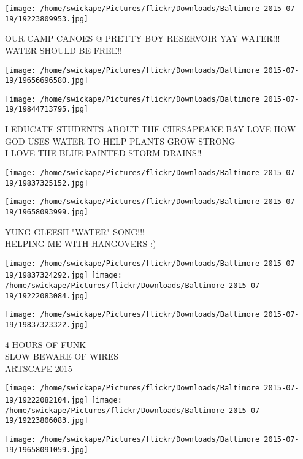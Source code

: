 \documentclass[10pt,letterpaper]{article}
\begin{document}
\vspace{0.25in}
\texttt{[image: /home/swickape/Pictures/flickr/Downloads/Baltimore 2015-07-19/19223809953.jpg]}

OUR CAMP CANOES @ PRETTY BOY RESERVOIR YAY WATER!!!\\
WATER SHOULD BE FREE!!\\
\pagebreak

\texttt{[image: /home/swickape/Pictures/flickr/Downloads/Baltimore 2015-07-19/19656696580.jpg]}

\vspace{0.25in}
\texttt{[image: /home/swickape/Pictures/flickr/Downloads/Baltimore 2015-07-19/19844713795.jpg]}

I EDUCATE STUDENTS ABOUT THE CHESAPEAKE BAY LOVE HOW GOD USES WATER TO HELP PLANTS GROW STRONG\\
I LOVE THE BLUE PAINTED STORM DRAINS!!\\
\pagebreak

\texttt{[image: /home/swickape/Pictures/flickr/Downloads/Baltimore 2015-07-19/19837325152.jpg]}

\vspace{0.25in}
\texttt{[image: /home/swickape/Pictures/flickr/Downloads/Baltimore 2015-07-19/19658093999.jpg]}

YUNG GLEESH "WATER" SONG!!!\\
HELPING ME WITH HANGOVERS :)\\
\pagebreak

\texttt{[image: /home/swickape/Pictures/flickr/Downloads/Baltimore 2015-07-19/19837324292.jpg]}
\texttt{[image: /home/swickape/Pictures/flickr/Downloads/Baltimore 2015-07-19/19222083084.jpg]}

\vspace{0.25in}
\texttt{[image: /home/swickape/Pictures/flickr/Downloads/Baltimore 2015-07-19/19837323322.jpg]}

4 HOURS OF FUNK\\
SLOW BEWARE OF WIRES\\
ARTSCAPE 2015\\
\pagebreak

\texttt{[image: /home/swickape/Pictures/flickr/Downloads/Baltimore 2015-07-19/19222082104.jpg]}
\texttt{[image: /home/swickape/Pictures/flickr/Downloads/Baltimore 2015-07-19/19223806083.jpg]}

\vspace{0.25in}
\texttt{[image: /home/swickape/Pictures/flickr/Downloads/Baltimore 2015-07-19/19658091059.jpg]}
\end{document}

